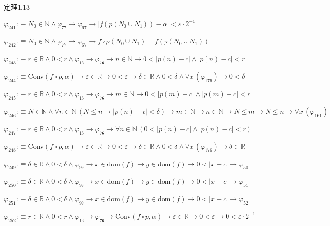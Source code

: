 \begin{fullproof}{定理1.13}
\begin{abbrevlist}
\item $\varphi_{241} :\equiv N_{0} \in \mathbb{N} \land \varphi_{77} \to \varphi_{67} \to \lvert f(p(N_{0} \cup N_{1})) - \alpha \rvert < \varepsilon \cdot 2^{-1}$
\item $\varphi_{242} :\equiv N_{0} \in \mathbb{N} \land \varphi_{77} \to \varphi_{67} \to f \circ p(N_{0} \cup N_{1}) = f(p(N_{0} \cup N_{1}))$
\item $\varphi_{243} :\equiv r \in \mathbb{R} \land 0 < r \land \varphi_{16} \to \varphi_{76} \to n \in \mathbb{N} \to 0 < \lvert p(n) - c \rvert \land \lvert p(n) - c \rvert < r$
\item $\varphi_{244} :\equiv \mathrm{Conv}(f \circ p,\alpha) \to \varepsilon \in \mathbb{R} \to 0 < \varepsilon \to \delta \in \mathbb{R} \land 0 < \delta \land \forall x\,(\varphi_{176}) \to 0 < \delta$
\item $\varphi_{245} :\equiv r \in \mathbb{R} \land 0 < r \land \varphi_{16} \to \varphi_{76} \to m \in \mathbb{N} \to 0 < \lvert p(m) - c \rvert \land \lvert p(m) - c \rvert < r$
\item $\varphi_{246} :\equiv N \in \mathbb{N} \land \forall n \in \mathbb{N}\,(N \leq n \to \lvert p(n) - c \rvert < \delta) \to m \in \mathbb{N} \to n \in \mathbb{N} \to N \leq m \to N \leq n \to \forall x\,(\varphi_{161})$
\item $\varphi_{247} :\equiv r \in \mathbb{R} \land 0 < r \land \varphi_{16} \to \varphi_{76} \to \forall n \in \mathbb{N}\,(0 < \lvert p(n) - c \rvert \land \lvert p(n) - c \rvert < r)$
\item $\varphi_{248} :\equiv \mathrm{Conv}(f \circ p,\alpha) \to \varepsilon \in \mathbb{R} \to 0 < \varepsilon \to \delta \in \mathbb{R} \land 0 < \delta \land \forall x\,(\varphi_{176}) \to \delta \in \mathbb{R}$
\item $\varphi_{249} :\equiv \delta \in \mathbb{R} \land 0 < \delta \land \varphi_{99} \to x \in \mathrm{dom}(f) \to y \in \mathrm{dom}(f) \to 0 < \lvert x - c \rvert \to \varphi_{50}$
\item $\varphi_{250} :\equiv \delta \in \mathbb{R} \land 0 < \delta \land \varphi_{99} \to x \in \mathrm{dom}(f) \to y \in \mathrm{dom}(f) \to 0 < \lvert x - c \rvert \to \varphi_{51}$
\item $\varphi_{251} :\equiv \delta \in \mathbb{R} \land 0 < \delta \land \varphi_{99} \to x \in \mathrm{dom}(f) \to y \in \mathrm{dom}(f) \to 0 < \lvert x - c \rvert \to \varphi_{52}$
\item $\varphi_{252} :\equiv r \in \mathbb{R} \land 0 < r \land \varphi_{16} \to \varphi_{76} \to \mathrm{Conv}(f \circ p,\alpha) \to \varepsilon \in \mathbb{R} \to 0 < \varepsilon \to 0 < \varepsilon \cdot 2^{-1}$

\end{abbrevlist}
\end{fullproof}
